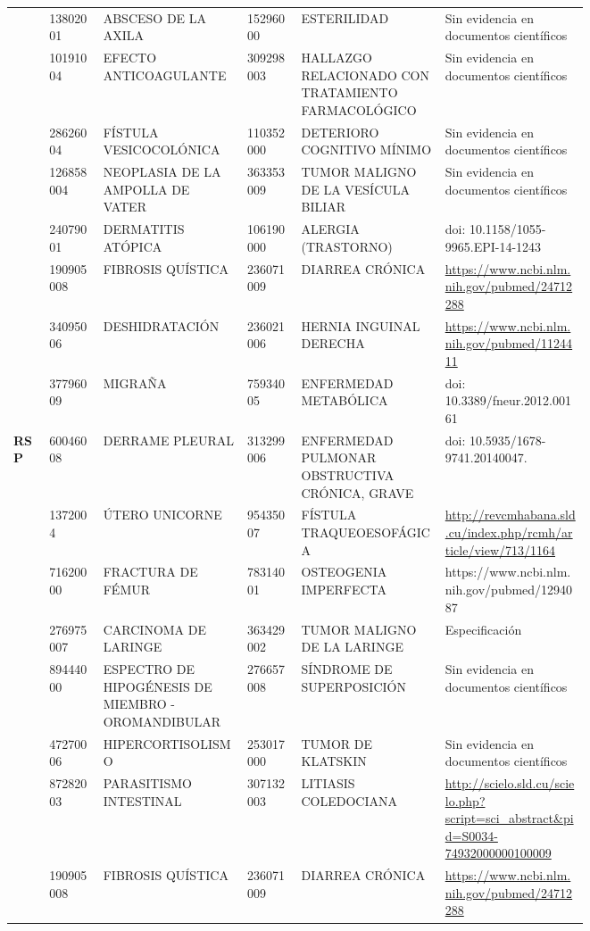 \begin{landscape}
\begin{longtable}[c]{@{}llp{0.25\linewidth}lp{0.25\linewidth}p{0.25\linewidth}@{}}
 & 13802001 & ABSCESO DE LA AXILA & 15296000 & ESTERILIDAD & Sin evidencia en documentos científicos \\
 & 10191004 & EFECTO ANTICOAGULANTE & 309298003 & HALLAZGO RELACIONADO CON TRATAMIENTO FARMACOLÓGICO & Sin evidencia en documentos científicos \\
 & 28626004 & FÍSTULA VESICOCOLÓNICA & 110352000 & DETERIORO COGNITIVO MÍNIMO & Sin evidencia en documentos científicos \\
 & 126858004 & NEOPLASIA DE LA AMPOLLA DE VATER & 363353009 & TUMOR MALIGNO DE LA VESÍCULA BILIAR & Sin evidencia en documentos científicos \\
 & 24079001 & DERMATITIS ATÓPICA & 106190000 & ALERGIA (TRASTORNO) & doi:  10.1158/1055-9965.EPI-14-1243 \\
 & 190905008 & FIBROSIS QUÍSTICA & 236071009 & DIARREA CRÓNICA & \url{https://www.ncbi.nlm.nih.gov/pubmed/24712288} \\
 & 34095006 & DESHIDRATACIÓN & 236021006 & HERNIA INGUINAL DERECHA & \url{https://www.ncbi.nlm.nih.gov/pubmed/1124411} \\
 & 37796009 & MIGRAÑA & 75934005 & ENFERMEDAD METABÓLICA & doi:  10.3389/fneur.2012.00161 \\
\multirow{44}{*}{\textbf{RSP}} & 60046008 & DERRAME PLEURAL & 313299006 & ENFERMEDAD PULMONAR OBSTRUCTIVA CRÓNICA, GRAVE & doi: 10.5935/1678-9741.20140047. \\
 & 1372004 & ÚTERO UNICORNE & 95435007 & FÍSTULA TRAQUEOESOFÁGICA & \url{http://revcmhabana.sld.cu/index.php/rcmh/article/view/713/1164} \\
 & 71620000 & FRACTURA DE FÉMUR & 78314001 & OSTEOGENIA IMPERFECTA & https://www.ncbi.nlm.nih.gov/pubmed/1294087 \\
 & 276975007 & CARCINOMA DE LARINGE & 363429002 & TUMOR MALIGNO DE LA LARINGE & Especificación \\
 & 89444000 & ESPECTRO DE HIPOGÉNESIS DE MIEMBRO - OROMANDIBULAR & 276657008 & SÍNDROME DE SUPERPOSICIÓN & Sin evidencia en documentos científicos \\
 & 47270006 & HIPERCORTISOLISMO & 253017000 & TUMOR DE KLATSKIN & Sin evidencia en documentos científicos \\
 & 87282003 & PARASITISMO INTESTINAL & 307132003 & LITIASIS COLEDOCIANA & \url{http://scielo.sld.cu/scielo.php?script=sci\_abstract\&pid=S0034-74932000000100009} \\
 & 190905008 & FIBROSIS QUÍSTICA & 236071009 & DIARREA CRÓNICA & \url{https://www.ncbi.nlm.nih.gov/pubmed/24712288} \\

\end{longtable}
\end{landscape}
